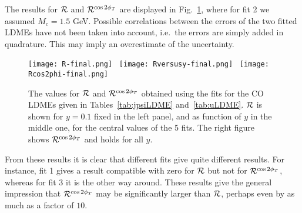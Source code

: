 \documentclass[prd,aps,preprintnumbers,nofootinbib,superscriptaddress]{revtex4}
\newcommand{\sT}{{\scriptscriptstyle T}}
\begin{document}
The results for ${\cal R}$ and ${\cal R}^{\cos2\phi_\sT}$ are displayed in Fig.\ \ref{fig:RU}, where for fit 2 we assumed $M_c=1.5$ GeV. Possible correlations between the errors of the two fitted LDMEs have not been taken into account, i.e.\ the errors are simply added in quadrature. This may imply an overestimate of the uncertainty. 
%
\begin{figure}[b] %
   \centering
   \texttt{[image: R-final.png]} \
    \texttt{[image: Rversusy-final.png]} \
     \texttt{[image: Rcos2phi-final.png]} 
      \caption{The values for ${\cal R}$ and ${\cal R}^{\cos2\phi_\sT}$ obtained using the fits for the CO LDMEs given in Tables~\ref{tab:jpsiLDME} and~\ref{tab:uLDME}. ${\cal R}$ is shown for $y=0.1$ fixed in the left panel, and as function of $y$ in the middle one, for the central values of the 5 fits. The right figure shows ${\cal R}^{\cos2\phi_\sT}$ and holds for all $y$.}
      \label{fig:RU}
\end{figure}
From these results it is clear that different fits give quite different results. 
For instance, fit 1 gives a result compatible with zero for ${\cal R}$ but not for ${\cal R}^{\cos2\phi_\sT}$, whereas for fit 3 it is the other way around. These results give the general impression that ${\cal R}^{\cos2\phi_\sT}$ may be significantly larger than ${\cal R}$, perhaps even by as much as a factor of $10$.
\end{document}
